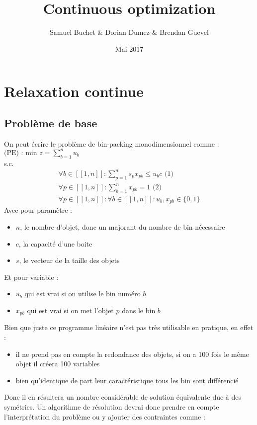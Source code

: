 \documentclass{article}
\title{Continuous optimization}
\author{Samuel Buchet \& Dorian Dumez \& Brendan Guevel}
\date{Mai 2017}
\begin{document}
\maketitle

\section{Relaxation continue}


\subsection{Problème de base}

On peut écrire le problème de bin-packing monodimensionnel comme :\\
$\text{(PE) : min } z = \sum \limits_{b = 1 }^{n} u_b$\\
s.c.
\begin{align*}
 \forall b \in [\![ 1 , n ]\!] : \sum \limits_{p = 1}^{n} s_p x_{pb} \leqslant u_b c \text{ (1)}\\
 \forall p \in [\![ 1 , n ]\!] : \sum \limits_{b = 1}^{n} x_{pb} = 1 \text{ (2)}\\
 \forall p \in [\![ 1 , n ]\!] : \forall b \in [\![ 1 , n ]\!] : u_b , x_{pb} \in \{0,1\}
\end{align*}
Avec pour paramètre :
\begin{itemize}
\item
$n$, le nombre d'objet, donc un majorant du nombre de bin nécessaire
\item
$c$, la capacité d'une boite
\item
$s$, le vecteur de la taille des objets
\end{itemize}
Et pour variable :
\begin{itemize}
\item
$u_b$ qui est vrai si on utilise le bin numéro $b$
\item
$x_{pb}$ qui est vrai si on met l'objet $p$ dans le bin $b$
\end{itemize}
Bien que juste ce programme linéaire n'est pas très utilisable en pratique, en effet :
\begin{itemize}
\item
il ne prend pas en compte la redondance des objets, si on a 100 fois le même objet il créera 100 variables
\item
bien qu'identique de part leur caractéristique tous les bin sont différencié
\end{itemize}
Donc il en résultera un nombre considérable de solution équivalente due à des symétries. Un algorithme de résolution devrai donc prendre en compte l’interprétation du problème ou y ajouter des contraintes comme :
\end{document}
